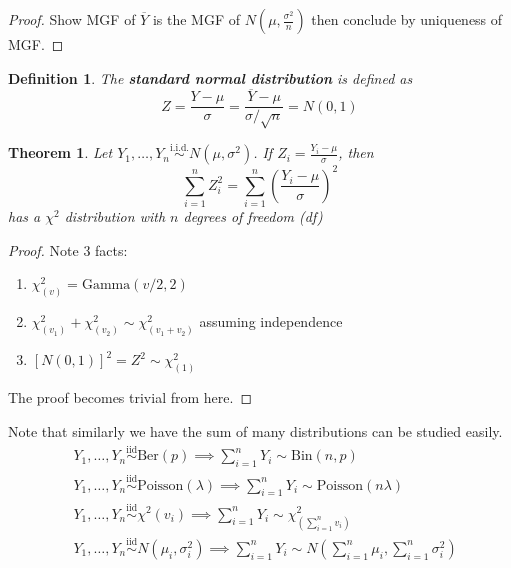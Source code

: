 \documentclass[a4paper,12pt]{article}
\theoremstyle{nonitalic}
\newtheorem{definition}{Definition}[subsection]
\newtheorem{theorem}{Theorem}[subsection]
\begin{document}
    
    \begin{proof}
        Show MGF of $\overline{Y}$ is the MGF of $N\left(\mu, \frac{\sigma^2}{n}\right)$ then conclude by uniqueness of MGF.
    \end{proof}
    
    \begin{definition}
        The \textbf{standard normal distribution} is defined as
        \[
            Z = \frac{Y - \mu}{\sigma} = \frac{\overline{Y} - \mu}{\sigma/\sqrt{n}} = N(0,1)
        \]
    \end{definition}

    \begin{theorem}
        Let \( Y_1, \ldots, Y_n \overset{\text{i.i.d.}}{\sim} N(\mu, \sigma^2) \). If \( Z_i = \frac{Y_i - \mu}{\sigma} \), then
        \[
        \sum_{i=1}^{n} Z_i^2 = \sum_{i=1}^{n} \left( \frac{Y_i - \mu}{\sigma} \right)^2
        \]
        has a \(\chi^2\) distribution with \(n\) degrees of freedom (df)
    \end{theorem}
    
    \begin{proof}
        Note 3 facts:
        \begin{enumerate}
            \item \(\chi^2_{(v)} = \text{Gamma}(v/2, 2)\)
            \item \(\chi^2_{(v_1)} + \chi^2_{(v_2)} \sim \chi^2_{(v_1 + v_2)}\) assuming independence
            \item \([N(0,1)]^2 = Z^2 \sim \chi^2_{(1)}\)
        \end{enumerate}

        The proof becomes trivial from here.
    \end{proof}

    Note that similarly we have the sum of many distributions can be studied easily.
    \[\begin{aligned}
        &Y_1, \ldots, Y_n \overset{\text{iid}}{\sim} \text{Ber}(p) \implies \sum_{i=1}^{n} Y_i \sim \text{Bin}(n, p) \\
        &Y_1, \ldots, Y_n \overset{\text{iid}}{\sim} \text{Poisson}(\lambda) \implies \sum_{i=1}^{n} Y_i \sim \text{Poisson}(n\lambda) \\
        &Y_1, \ldots, Y_n \overset{\text{iid}}{\sim} \chi^2(v_i) \implies \sum_{i=1}^{n} Y_i \sim \chi^2_{\left(\sum\limits_{i=1}^{n} v_i\right)}\\
        &Y_1, \ldots, Y_n \overset{\text{iid}}{\sim} N(\mu_i, \sigma^2_i) \implies \sum_{i=1}^{n} Y_i \sim N\left(\sum\limits_{i=1}^{n} \mu_i, \sum\limits_{i=1}^{n} \sigma^2_i\right)
    \end{aligned}\]
\end{document}

